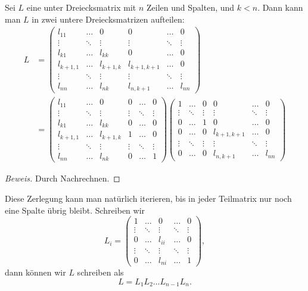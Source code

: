 \begin{hilfssatz}
Sei $L$ eine unter Dreiecksmatrix mit $n$ Zeilen und Spalten, und $k<n$.
Dann kann man $L$ in zwei untere Dreiecksmatrizen aufteilen:
\begin{align*}
L&=
\begin{pmatrix}
l_{11}   &\dots &0        &0          &\dots &0     \\
\vdots   &\ddots&\vdots   &\vdots     &\ddots&\vdots\\
l_{k1}   &\dots &l_{kk}   &0          &\dots &0     \\
l_{k+1,1}&\dots &l_{k+1,k}&l_{k+1,k+1}&\dots &0     \\
\vdots   &\ddots&\vdots   &\vdots     &\ddots&\vdots\\
l_{nn}   &\dots &l_{nk}   &l_{n,k+1}  &\dots &l_{nn}
\end{pmatrix}
\\
&=
\begin{pmatrix}
l_{11}   &\dots &0        &0          &\dots &0     \\
\vdots   &\ddots&\vdots   &\vdots     &\ddots&\vdots\\
l_{k1}   &\dots &l_{kk}   &0          &\dots &0     \\
l_{k+1,1}&\dots &l_{k+1,k}&1          &\dots &0     \\
\vdots   &\ddots&\vdots   &\vdots     &\ddots&\vdots\\
l_{nn}   &\dots &l_{nk}   &0          &\dots &1
\end{pmatrix}
\begin{pmatrix}
1        &\dots &0        &0          &\dots &0     \\
\vdots   &\ddots&\vdots   &\vdots     &\ddots&\vdots\\
0        &\dots &1        &0          &\dots &0     \\
0        &\dots &0        &l_{k+1,k+1}&\dots &0     \\
\vdots   &\ddots&\vdots   &\vdots     &\ddots&\vdots\\
0        &\dots &0        &l_{n,k+1}  &\dots &l_{nn}
\end{pmatrix}
\end{align*}
\end{hilfssatz}

\begin{proof}[Beweis]
Durch Nachrechnen.
\end{proof}

Diese Zerlegung kann man natürlich iterieren, bis in jeder Teilmatrix
nur noch eine Spalte übrig bleibt.
Schreiben wir
\[
L_i=\begin{pmatrix}
1      &\dots &0     &\dots &0     \\
\vdots &\ddots&\vdots&\ddots&\vdots\\
0      &\dots &l_{ii}&\dots &0     \\
\vdots &\ddots&\vdots&\ddots&\vdots\\
0      &\dots &l_{ni}&\dots &1
\end{pmatrix},
\]
dann können wir $L$ schreiben als
\begin{equation}
L=L_1L_2\dots L_{n-1}L_n.
\label{lproductdecomposition}
\end{equation}

